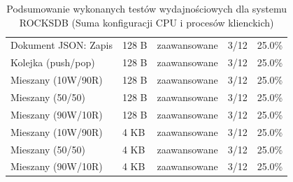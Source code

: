 \begin{table}[ht]
{\begin{tabular}{lllcc}
Dokument JSON: Zapis & 128 B & zaawansowane & 3/12 & 25.0\% \\
Kolejka (push/pop) & 128 B & zaawansowane & 3/12 & 25.0\% \\
Mieszany (10W/90R) & 128 B & zaawansowane & 3/12 & 25.0\% \\
Mieszany (50/50) & 128 B & zaawansowane & 3/12 & 25.0\% \\
Mieszany (90W/10R) & 128 B & zaawansowane & 3/12 & 25.0\% \\
Mieszany (10W/90R) & 4 KB & zaawansowane & 3/12 & 25.0\% \\
Mieszany (50/50) & 4 KB & zaawansowane & 3/12 & 25.0\% \\
Mieszany (90W/10R) & 4 KB & zaawansowane & 3/12 & 25.0\% \\
\bottomrule
\end{tabular}%
}
\caption{Podsumowanie wykonanych testów wydajnościowych dla systemu ROCKSDB (Suma konfiguracji CPU i procesów klienckich)}
\label{tab:executed_tests_rocksdb}
\end{table}
